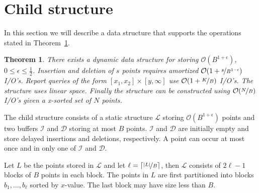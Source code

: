 \documentclass[twoside,11pt,openright]{report}
\newtheorem{theorem}{Theorem}
\begin{document}
\section{Child structure} %
\label{sec:child_structure}
In this section we will describe a data structure that supports the operations stated in Theorem~\ref{thm:child_structure}.
\begin{theorem}
\label{thm:child_structure}
There exists a dynamic data structure for storing $\mathcal{O}(B^{1+\epsilon})$, $0 \leq \epsilon \leq \frac{1}{2}$.
Insertion and deletion of $s$ points requires amortized $\mathcal{O}(1+\nicefrac{s}{B^{1-\epsilon}})$ I/O's.
Report queries of the form $[x_1,x_2] \times [y,\infty]$ use $\mathcal{O}(1+\nicefrac{K}{B})$ I/O's.
The structure uses linear space.
Finally the structure can be constructed using $\mathcal{O}(\nicefrac{N}{B})$ I/O's given a x-sorted set of $N$ points.
\end{theorem}

The child structure consists of a static structure $\mathcal{L}$ storing $\mathcal{O}(B^{1+\epsilon})$ points and two buffers $\mathcal{I}$ and $\mathcal{D}$ storing at most $B$ points. $\mathcal{I}$ and $\mathcal{D}$ are initially empty and store delayed insertions and deletions, respectively. A point can occur at most once and in only one of $\mathcal{I}$ and $\mathcal{D}$.

Let $L$ be the points stored in $\mathcal{L}$ and let $\ell = \lceil \nicefrac{\vert L \vert}{B}\rceil$, then $\mathcal{L}$ consists of $2\ell-1$ blocks of $B$ points in each block. The points in $L$ are first partitioned into blocks $b_1,\dots,b_\ell$ sorted by $x$-value. The last block may have size less than $B$.
\end{document}
